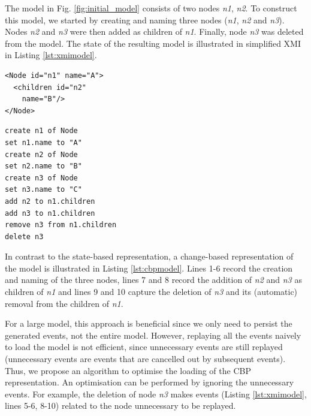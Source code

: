 \documentclass{llncs}
\begin{document}
The model in Fig. \ref{fig:initial_model} consists of two nodes \emph{n1}, \emph{n2}. To construct this model, we started by creating and naming three nodes (\emph{n1}, \emph{n2} and \emph{n3}). Nodes \emph{n2} and \emph{n3} were then added as children of \emph{n1}. Finally, node \emph{n3} was deleted from the model. The state of the resulting model is illustrated in simplified XMI in Listing \ref{lst:xmimodel}.

\noindent
\begin{minipage}[t]{0.34\linewidth}
\begin{lstlisting}[style=xmi,caption={State-based representation of the tree model in (simplified) XMI.},label=lst:xmimodel]
<Node id="n1" name="A">
  <children id="n2" 
    name="B"/>
</Node>
\end{lstlisting}
\end{minipage}
\hfill
\begin{minipage}[t]{0.635\linewidth}
\begin{lstlisting}[style=eol,caption={Change-based representation of the tree model.},label=lst:cbpmodel]
create n1 of Node
set n1.name to "A"      
create n2 of Node
set n2.name to "B"      
create n3 of Node
set n3.name to "C"      
add n2 to n1.children   
add n3 to n1.children   
remove n3 from n1.children 
delete n3
\end{lstlisting}
\end{minipage}

In contrast to the state-based representation, a change-based representation of the model is illustrated in Listing \ref{lst:cbpmodel}. Lines 1-6 record the creation and naming of the three nodes, lines 7 and 8 record the addition of \emph{n2} and \emph{n3} as children of \emph{n1} and lines 9 and 10 capture the deletion of \emph{n3} and its (automatic) removal from the children of \emph{n1}.


For a large model, this approach is beneficial since we only need to persist the generated events, not the entire model. However, replaying all the events naively to load the model is not efficient, since unnecessary events are still replayed (unnecessary events are events that are cancelled out by subsequent events). Thus, we propose an algorithm to optimise the loading of the CBP representation. An optimisation can be performed by ignoring the unnecessary events. For example, the deletion of node \emph{n3} makes events (Listing \ref{lst:xmimodel}, lines 5-6, 8-10) related to the node unnecessary to be replayed. 
\end{document}
